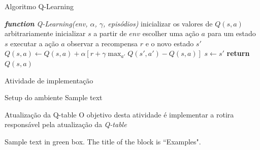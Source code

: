 \documentclass{beamer}
\begin{document}
\begin{frame}{Algoritmo Q-Learning} 
	\begin{algorithmic} 
		\STATE \emph{\textbf{function} Q-Learning(env, $\alpha$, $\gamma$, episódios)}
		\STATE inicializar os valores de $Q(s, a)$ arbitrariamente
		\STATE inicializar $s$ a partir de $env$
		\REPEAT
		\STATE escolher uma ação $a$ para um estado $s$
		\STATE executar a ação $a$
		\STATE observar a recompensa $r$ e o novo estado $s'$ 
		\STATE $Q(s,a) \leftarrow Q(s,a) + \alpha [r +\gamma \max_{a'}{Q(s', a')} - Q(s,a)]$
		\STATE$s  \leftarrow s'$
		\ENDFOR
		\STATE \textbf{return} $Q(s, a)$
	\end{algorithmic}
\end{frame}


\begin{frame}{Atividade de implementação}
	
	\begin{block}{Setup do ambiente}
		Sample text
	\end{block}
	
	\begin{alertblock}{Atualização da Q-table}
		O objetivo desta atividade é implementar a rotira responsável pela atualização da \textit{Q-table}
	\end{alertblock}
	
	\begin{examples}
		Sample text in green box. The title of the block is ``Examples".
	\end{examples}
\end{frame}

%
%
\end{document}

